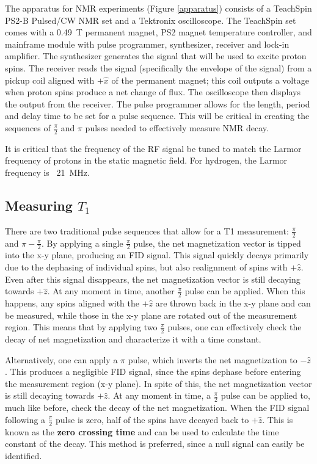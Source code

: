 \documentclass[
    floatfix,  %
    reprint,
    amsmath,
    amssymb,
    aps,
]{revtex4-2}
\newcommand{\halfpi}{\frac{\pi}{2}}
\begin{document}
The apparatus for NMR experiments (Figure \ref{apparatus}) consists of a TeachSpin PS2-B Pulsed/CW NMR set \cite{teachspin-ps2} and a Tektronix oscilloscope. The TeachSpin set comes with a \SI{0.49}{\tesla} permanent magnet, PS2 magnet temperature controller, and mainframe module with pulse programmer, synthesizer, receiver and lock-in amplifier. The synthesizer generates the signal that will be used to excite proton spins. The receiver reads the signal (specifically the envelope of the signal) from a pickup coil aligned with $+\hat{x}$ of the permanent magnet; this coil outputs a voltage when proton spins produce a net change of flux. The oscilloscope then displays the output from the receiver. The pulse programmer allows for the length, period and delay time to be set for a pulse sequence. This will be critical in creating the sequences of $\halfpi$ and $\pi$ pulses needed to effectively measure NMR decay.

It is critical that the frequency of the RF signal be tuned to match the Larmor frequency of protons in the static magnetic field. For hydrogen, the Larmor frequency is ~\SI{21}{\mega\hertz}.






\subsection{Measuring $T_1$ \label{sec:measure-t1}}

There are two traditional pulse sequences that allow for a T1 measurement: $\halfpi$ and $\pi-\halfpi$. By applying a single $\halfpi$ pulse, the net magnetization vector is tipped into the x-y plane, producing an FID signal. This signal quickly decays primarily due to the dephasing of individual spins, but also realignment of spins with $+\hat{z}$. Even after this signal disappears, the net magnetization vector is still decaying towards $+\hat{z}$. At any moment in time, another $\halfpi$ pulse can be applied. When this happens, any spins aligned with the $+\hat{z}$ are thrown back in the x-y plane and can be measured, while those in the x-y plane are rotated out of the measurement region. This means that by applying two $\halfpi$ pulses, one can effectively check the decay of net magnetization and characterize it with a time constant.

Alternatively, one can apply a $\pi$ pulse, which inverts the net magnetization to $-\hat{z}$. This produces a negligible FID signal, since the spins dephase before entering the measurement region (x-y plane). In spite of this, the net magnetization vector is still decaying towards $+\hat{z}$. At any moment in time, a $\halfpi$ pulse can be applied to, much like before, check the decay of the net magnetization. When the FID signal following a $\halfpi$ pulse is zero, half of the spins have decayed back to $+\hat{z}$. This is known as the \textbf{zero crossing time} and can be used to calculate the time constant of the decay. This method is preferred, since a null signal can easily be identified.
\end{document}
